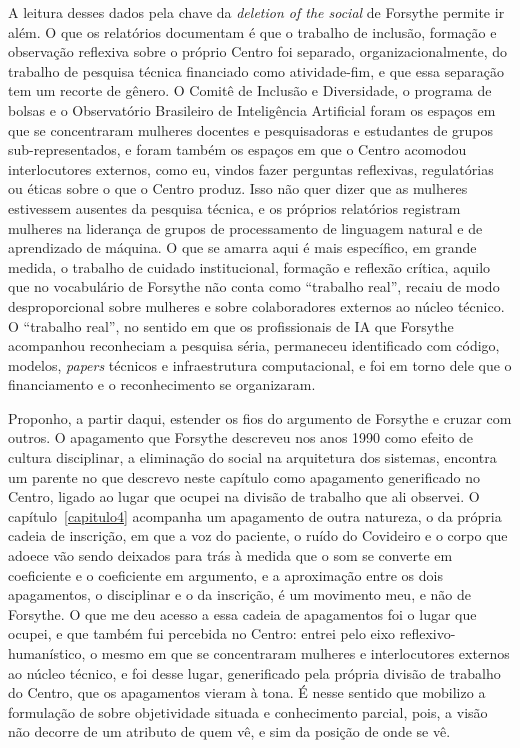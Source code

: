 A leitura desses dados pela chave da \textit{deletion of the social} de Forsythe permite ir além. O que os relatórios documentam é que o trabalho de inclusão, formação e observação reflexiva sobre o próprio Centro foi separado, organizacionalmente, do trabalho de pesquisa técnica financiado como atividade-fim, e que essa separação tem um recorte de gênero. O Comitê de Inclusão e Diversidade, o programa de bolsas e o Observatório Brasileiro de Inteligência Artificial foram os espaços em que se concentraram mulheres docentes e pesquisadoras e estudantes de grupos sub-representados, e foram também os espaços em que o Centro acomodou interlocutores externos, como eu, vindos fazer perguntas reflexivas, regulatórias ou éticas sobre o que o Centro produz. Isso não quer dizer que as mulheres estivessem ausentes da pesquisa técnica, e os próprios relatórios registram mulheres na liderança de grupos de processamento de linguagem natural e de aprendizado de máquina. O que se amarra aqui é mais específico, em grande medida, o trabalho de cuidado institucional, formação e reflexão crítica, aquilo que no vocabulário de Forsythe não conta como \enquote{trabalho real}, recaiu de modo desproporcional sobre mulheres e sobre colaboradores externos ao núcleo técnico. O \enquote{trabalho real}, no sentido em que os profissionais de IA que Forsythe acompanhou reconheciam a pesquisa séria, permaneceu identificado com código, modelos, \textit{papers} técnicos e infraestrutura computacional, e foi em torno dele que o financiamento e o reconhecimento se organizaram.

Proponho, a partir daqui, estender os fios do argumento de Forsythe e cruzar com outros. O apagamento que Forsythe descreveu nos anos 1990 como efeito de cultura disciplinar, a eliminação do social na arquitetura dos sistemas, encontra um parente no que descrevo neste capítulo como apagamento generificado no Centro, ligado ao lugar que ocupei na divisão de trabalho que ali observei. O capítulo~\ref{capitulo4} acompanha um apagamento de outra natureza, o da própria cadeia de inscrição, em que a voz do paciente, o ruído do Covideiro e o corpo que adoece vão sendo deixados para trás à medida que o som se converte em coeficiente e o coeficiente em argumento, e a aproximação entre os dois apagamentos, o disciplinar e o da inscrição, é um movimento meu, e não de Forsythe. O que me deu acesso a essa cadeia de apagamentos foi o lugar que ocupei, e que também fui percebida no Centro: entrei pelo eixo reflexivo-humanístico, o mesmo em que se concentraram mulheres e interlocutores externos ao núcleo técnico, e foi desse lugar, generificado pela própria divisão de trabalho do Centro, que os apagamentos vieram à tona. É nesse sentido que mobilizo a formulação de \textcite{Haraway1991Situated} sobre objetividade situada e conhecimento parcial, pois, a visão não decorre de um atributo de quem vê, e sim da posição de onde se vê.

